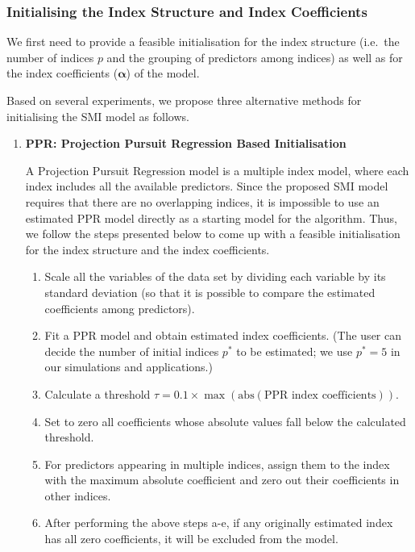 \documentclass[
  11pt,
  a4paper,
]{article}
\providecommand{\tightlist}{%
  \setlength{\itemsep}{0pt}\setlength{\parskip}{0pt}}\usepackage{longtable,booktabs,array}
\begin{document}
\subsubsection{Initialising the Index Structure and Index
Coefficients}\label{sec-step1}

We first need to provide a feasible initialisation for the index
structure (i.e.~the number of indices \(p\) and the grouping of
predictors among indices) as well as for the index coefficients
(\(\bm{\alpha}\)) of the model.

Based on several experiments, we propose three alternative methods for
initialising the SMI model as follows.

\begin{enumerate}
\def\labelenumi{\arabic{enumi}.}
\item
  \textbf{PPR: Projection Pursuit Regression Based Initialisation}

  A Projection Pursuit Regression model \autocite{Friedman1981} is a
  multiple index model, where each index includes all the available
  predictors. Since the proposed SMI model requires that there are no
  overlapping indices, it is impossible to use an estimated PPR model
  directly as a starting model for the algorithm. Thus, we follow the
  steps presented below to come up with a feasible initialisation for
  the index structure and the index coefficients.

  \begin{enumerate}
  \def\labelenumii{\alph{enumii}.}
  \tightlist
  \item
    Scale all the variables of the data set by dividing each variable by
    its standard deviation (so that it is possible to compare the
    estimated coefficients among predictors).
  \item
    Fit a PPR model and obtain estimated index coefficients. (The user
    can decide the number of initial indices \(p^*\) to be estimated; we
    use \(p^* = 5\) in our simulations and applications.)
  \item
    Calculate a threshold
    \(\tau = 0.1 \times \max(\mathrm{abs}(\text{PPR index coefficients}))\).
  \item
    Set to zero all coefficients whose absolute values fall below the
    calculated threshold.
  \item
    For predictors appearing in multiple indices, assign them to the
    index with the maximum absolute coefficient and zero out their
    coefficients in other indices.
  \item
    After performing the above steps a-e, if any originally estimated
    index has all zero coefficients, it will be excluded from the model.
  \end{enumerate}


\end{enumerate}
\end{document}

